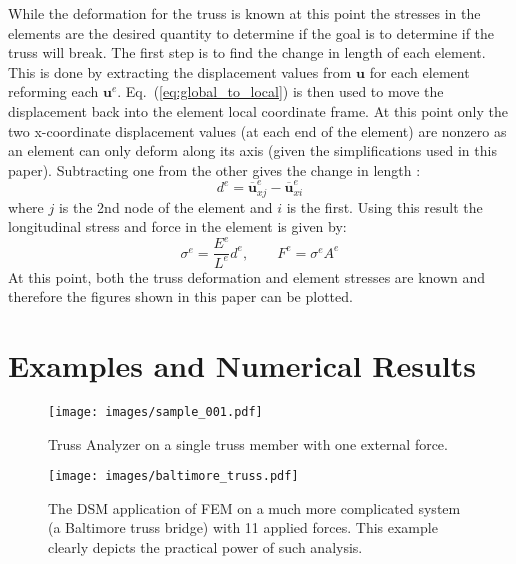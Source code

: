 \documentclass{article}
\begin{document}
While the deformation for the truss is known at this point the stresses in the
elements are the desired quantity to determine if the goal is to determine if
the truss will break.  The first step is to find the change in length of each
element.  This is done by extracting the displacement values from $\mathbf{u}$
for each element reforming each $\mathbf{u}^e$.
Eq.~(\ref{eq:global_to_local}) is then used to move the displacement back into
the element local coordinate frame.  At this point only the two x-coordinate
displacement values (at each end of the element) are nonzero as an element can
only deform along its axis (given the simplifications used in this paper).
Subtracting one from the other gives the change in length
\parencite{felippa2004ch3}:
\begin{equation}
    d^e=\overline{\mathbf{u}}^e_{xj}-\overline{\mathbf{u}}^e_{xi}
\end{equation}
where $j$ is the 2nd node of the element and $i$ is the first.  Using this
result the longitudinal stress and force in the element is given by:
\begin{equation}
    \sigma^e=\frac{E^e}{L^e}d^e,\qquad
    F^e=\sigma^eA^e
\end{equation}
At this point, both the truss deformation and element stresses are known and
therefore the figures shown in this paper can be plotted.




\section{Examples and Numerical Results}

\begin{figure}[H]
    \begin{center}
        \texttt{[image: images/sample\_001.pdf]}
        \caption{Truss Analyzer on a single truss member with one external
        force.}
    \end{center}
\end{figure}


\begin{figure}[H]
    \begin{center}
        \texttt{[image: images/baltimore\_truss.pdf]}
        \caption{The DSM application of FEM on a much more complicated system
        (a Baltimore truss bridge) with 11 applied forces. This example
        clearly depicts the practical power of such analysis.}
    \end{center}
\end{figure}
\end{document}
